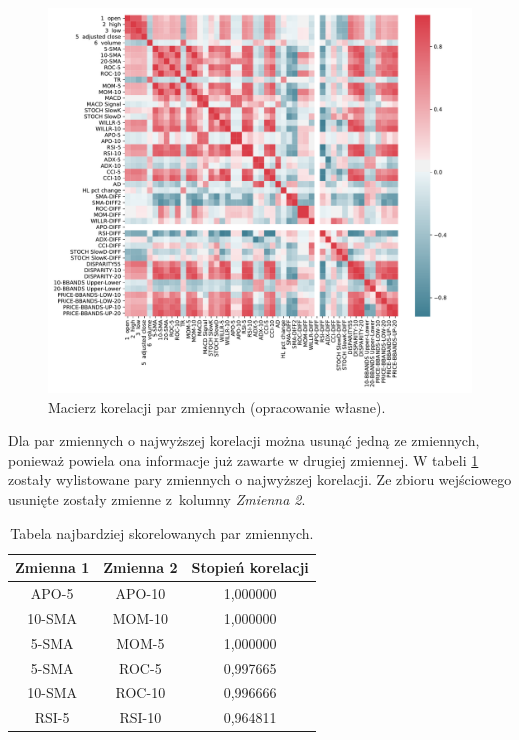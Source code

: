 \documentclass[a4paper, twoside, 11pt, openright]{article}
\begin{document}
\begin{figure}[H]
\centering 
\includegraphics[scale=0.65]{img/corr_matrix.pdf}
\caption{Macierz korelacji par zmiennych (opracowanie własne).}
\label{img:correlation}
\end{figure}

Dla par zmiennych o najwyższej korelacji można usunąć jedną ze zmiennych, ponieważ powiela ona informacje już zawarte w drugiej zmiennej.  W tabeli \ref{tab:ccorr_table1} zostały wylistowane pary zmiennych o najwyższej korelacji. Ze zbioru wejściowego usunięte zostały zmienne z~kolumny \textit{Zmienna 2}.


\begin{table}[H]
\centering
\begin{tabular}{ |c|c|c| } 
 \hline
Zmienna 1 & Zmienna 2 &  Stopień korelacji \\
 \hline
APO-5 & APO-10 &  1,000000 \\
 \hline
10-SMA & MOM-10 &  1,000000 \\
 \hline
5-SMA & MOM-5 &  1,000000 \\
 \hline
5-SMA & ROC-5 &  0,997665 \\
 \hline
10-SMA & ROC-10 &  0,996666 \\
 \hline
RSI-5 & RSI-10 &  0,964811 \\  
 \hline
\end{tabular}
\caption{Tabela najbardziej skorelowanych par zmiennych.}
\label{tab:ccorr_table1}
\end{table}
\end{document}

